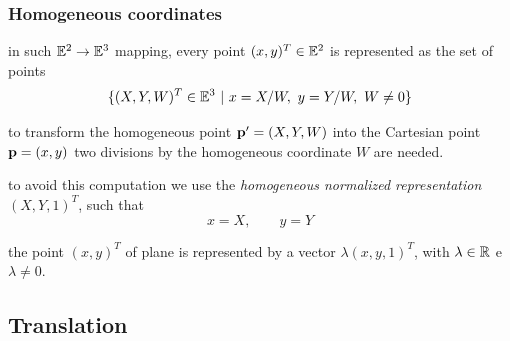 \documentclass{beamer}
\begin{document}
\begin{frame}\frametitle{Homogeneous coordinates} \small

\vfill
in such  $\mathbb{E}^2\rightarrow \mathbb{E}^3$ mapping, every point $(x, y)^T\in{\mathbb{E}}^2$ is represented as the set of points 
\[
\{(X, Y, W)^T\in{\E}^3 \  | \ x=X/W,\ y = Y/W,\ W\not= 0\}
\]


\vfill

to transform the homogeneous point  ${\bf p}' = (X, Y, W)$ into the Cartesian point ${\bf p} = (x, y)$ two divisions by the homogeneous coordinate $W$ are needed.  

\vfill

to avoid this computation we use the \emph{homogeneous normalized representation} $(X, Y, 1)^T$, such that
\[
x = X, \qquad y = Y
\]

\vfill

the point $(x, y)^T$ of plane is represented by a vector $\lambda (x, y, 1)^T$, with $\lambda\in\mathbb{R}$ e $\lambda \not=0$.
\end{frame}

\subsection{Translation}
\end{document}
